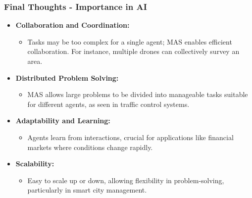 \documentclass[aspectratio=169]{beamer}
\begin{document}
\begin{frame}[fragile]
    \frametitle{Final Thoughts - Importance in AI}
    \begin{itemize}
        \item \textbf{Collaboration and Coordination:} 
        \begin{itemize}
            \item Tasks may be too complex for a single agent; MAS enables efficient collaboration. For instance, multiple drones can collectively survey an area.
        \end{itemize}
        
        \item \textbf{Distributed Problem Solving:}
        \begin{itemize}
            \item MAS allows large problems to be divided into manageable tasks suitable for different agents, as seen in traffic control systems.
        \end{itemize}

        \item \textbf{Adaptability and Learning:}
        \begin{itemize}
            \item Agents learn from interactions, crucial for applications like financial markets where conditions change rapidly.
        \end{itemize}

        \item \textbf{Scalability:}
        \begin{itemize}
            \item Easy to scale up or down, allowing flexibility in problem-solving, particularly in smart city management.
        \end{itemize}
    \end{itemize}
\end{frame}
\end{document}
